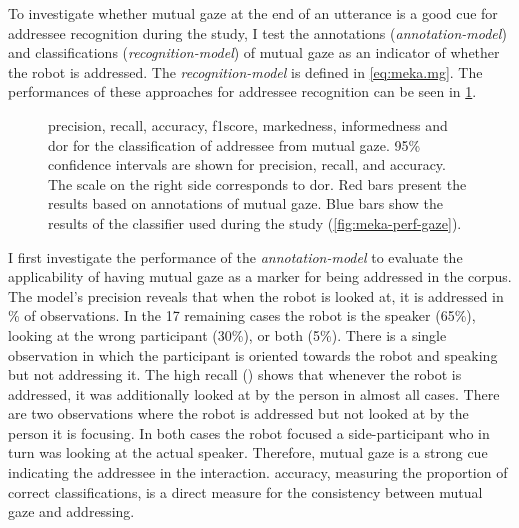 To investigate whether mutual gaze at the end of an utterance is a good cue for \gls{addressee} recognition during the study, I test the annotations (\emph{annotation-model}) and classifications (\emph{recognition-model}) of mutual gaze as an indicator of whether the \gls{robot} is addressed.
The \emph{recognition-model} is defined in \cref{eq:meka.mg}.
The performances of these approaches for \gls{addressee} recognition can be seen in \cref{fig:meka-perf-mad}.

\begin{figure}[htb]
    \centering
    
    \vspace{-25pt}
    \caption[Addressee recognition from mutual-gaze.]{\label{fig:meka-perf-mad}
    \Gls{precision}, \gls{recall}, \gls{accuracy}, \gls{f1score}, \gls{markedness}, \gls{informedness} and \gls{dor} for the classification of \gls{addressee} from mutual gaze.
    95\% confidence intervals are shown for \gls{precision}, \gls{recall}, and \gls{accuracy}.
    The scale on the right side corresponds to \gls{dor}.
    Red bars present the results based on annotations of mutual gaze.
    Blue bars show the results of the classifier used during the study (\cref{fig:meka-perf-gaze}).
    }
\end{figure}
I first investigate the performance of the \emph{annotation-model} to evaluate the applicability of having mutual gaze as a marker for being addressed in the corpus.
The model's \gls{precision} reveals that when the \gls{robot} is looked at, it is addressed in \% of observations.
In the 17 remaining cases the \gls{robot} is the \gls{speaker} (65\%), looking at the wrong participant (30\%), or both (5\%).
There is a single observation in which the participant is oriented towards the \gls{robot} and speaking but not addressing it.
The high \gls{recall} () shows that whenever the \gls{robot} is addressed, it was additionally looked at by the person in almost all cases.
There are two observations where the \gls{robot} is addressed but not looked at by the person it is focusing.
In both cases the \gls{robot} focused a \gls{side-participant} who in \gls{turn} was looking at the actual \gls{speaker}.
Therefore, mutual gaze is a strong cue indicating the \gls{addressee} in the interaction.
\Gls{accuracy}, measuring the proportion of correct classifications, is a direct measure for the consistency between mutual gaze and addressing.
